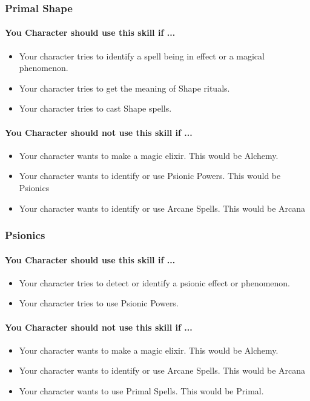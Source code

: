 \begin{multicols}{2}
\subsubsection{Primal Shape}\label{skill:primal_shape}
\paragraph{You Character should use this skill if ...}
\begin{itemize}
    \item Your character tries to identify a spell being in effect or a magical
        phenomenon.
    \item Your character tries to get the meaning of Shape rituals.
    \item Your character tries to cast Shape spells.
\end{itemize}
\paragraph{You Character should not use this skill if ...}
\begin{itemize}
    \item Your character wants to make a magic elixir.  This would be Alchemy.
    \item Your character wants to identify or use Psionic Powers. This would be
        Psionics
    \item Your character wants to identify or use Arcane Spells. This would be
        Arcana
\end{itemize}

\subsubsection{Psionics}\label{skill:psionics}
\paragraph{You Character should use this skill if ...}
\begin{itemize}
    \item Your character tries to detect or identify a psionic effect or
        phenomenon.
    \item Your character tries to use Psionic Powers.
\end{itemize}
\paragraph{You Character should not use this skill if ...}
\begin{itemize}
    \item Your character wants to make a magic elixir.  This would be Alchemy.
    \item Your character wants to identify or use Arcane Spells. This would
        be Arcana
    \item Your character wants to use Primal Spells. This would be Primal.
\end{itemize}

\end{multicols}
